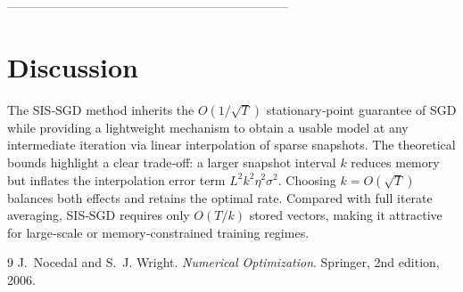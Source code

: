 \documentclass{article}
\begin{document}
--------------------------------------------------------------------

\section*{Discussion}
The SIS‑SGD method inherits the $O(1/\sqrt{T})$ stationary‑point guarantee of SGD while providing a lightweight mechanism to obtain a usable model at any intermediate iteration via linear interpolation of sparse snapshots. The theoretical bounds highlight a clear trade‑off: a larger snapshot interval $k$ reduces memory but inflates the interpolation error term $L^2k^2\eta^2\sigma^2$. Choosing $k=O(\sqrt{T})$ balances both effects and retains the optimal rate. Compared with full iterate averaging, SIS‑SGD requires only $O(T/k)$ stored vectors, making it attractive for large‑scale or memory‑constrained training regimes.


\begin{thebibliography}{9}
J.~Nocedal and S.~J. Wright.
\newblock \emph{Numerical Optimization}.
\newblock Springer, 2nd edition, 2006.
\end{thebibliography}
\end{document}
